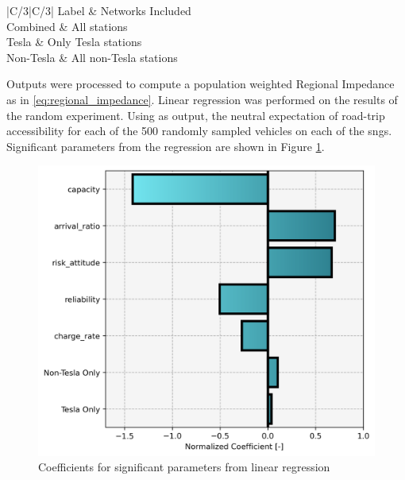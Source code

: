 \documentclass[11pt]{article}
\begin{document}
\begin{multicols}{2}
\begin{table}[H]
	\centering
	\caption{\glspl{sng} used in experiment.}
	\label{tab:experimental_sngs}
	\begin{tabular}{|C{\linewidth/3}|C{/3}|}
		\hline Label & Networks Included \\
		\hline Combined & All stations \\
		\hline Tesla & Only Tesla stations \\
		\hline Non-Tesla & All non-Tesla stations \\
		\hline
	\end{tabular}
\end{table}

Outputs were processed to compute a population weighted Regional Impedance as in \eqref{eq:regional_impedance}. Linear regression was performed on the results of the random experiment. Using as output, the neutral expectation of road-trip accessibility for each of the 500 randomly sampled vehicles on each of the \glspl{sng}. Significant parameters from the regression are shown in Figure \ref{fig:significant_parameters}.

\begin{figure}[H]
	\centering
	\includegraphics[width = \linewidth]{figs/significant_parameters.png}
	\caption{Coefficients for significant parameters from linear regression}
	\label{fig:significant_parameters}
\end{figure}


\end{multicols}
\end{document}
